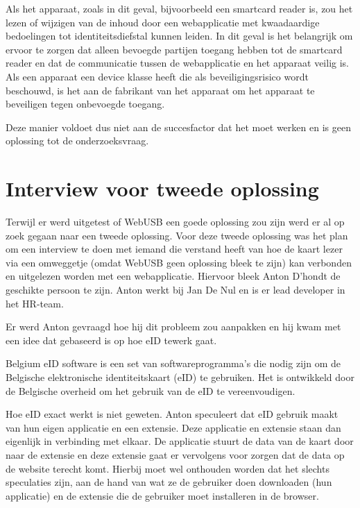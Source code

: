 Als het apparaat, zoals in dit geval, bijvoorbeeld een smartcard reader is, zou het lezen of wijzigen van de inhoud door een webapplicatie met kwaadaardige bedoelingen tot identiteitsdiefstal kunnen leiden. In dit geval is het belangrijk om ervoor te zorgen dat alleen bevoegde partijen toegang hebben tot de smartcard reader en dat de communicatie tussen de webapplicatie en het apparaat veilig is. Als een apparaat een device klasse heeft die als beveiligingsrisico wordt beschouwd, is het aan de fabrikant van het apparaat om het apparaat te beveiligen tegen onbevoegde toegang.

Deze manier voldoet dus niet aan de succesfactor dat het moet werken en is geen oplossing tot de onderzoeksvraag.




\section{Interview voor tweede oplossing}
Terwijl er werd uitgetest of WebUSB een goede oplossing zou zijn werd er al op zoek gegaan naar een tweede oplossing. Voor deze tweede oplossing was het plan om een interview te doen met iemand die verstand heeft van hoe de kaart lezer via een omweggetje (omdat WebUSB geen oplossing bleek te zijn) kan verbonden en uitgelezen worden met een webapplicatie. Hiervoor bleek Anton D’hondt de geschikte persoon te zijn. Anton werkt bij Jan De Nul en is er lead developer in het HR-team. 

Er werd Anton gevraagd hoe hij dit probleem zou aanpakken en hij kwam met een idee dat gebaseerd is op hoe eID tewerk gaat. 

Belgium eID software is een set van softwareprogramma's die nodig zijn om de Belgische elektronische identiteitskaart (eID) te gebruiken. Het is ontwikkeld door de Belgische overheid om het gebruik van de eID te vereenvoudigen. 

Hoe eID exact werkt is niet geweten. Anton speculeert dat eID gebruik maakt van hun eigen applicatie en een extensie. Deze applicatie en extensie staan dan eigenlijk in verbinding met elkaar. De applicatie stuurt de data van de kaart door naar de extensie en deze extensie gaat er vervolgens voor zorgen dat de data op de website terecht komt. Hierbij moet wel onthouden worden dat het slechts speculaties zijn, aan de hand van wat ze de gebruiker doen downloaden (hun applicatie) en de extensie die de gebruiker moet installeren in de browser. 


